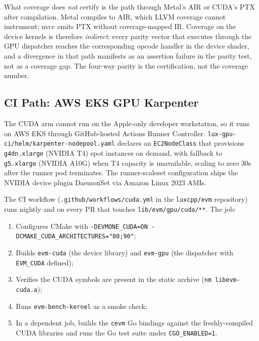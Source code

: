 What coverage does \emph{not} certify is the path through Metal's AIR
or CUDA's PTX after compilation. Metal compiles to AIR, which LLVM
coverage cannot instrument; nvcc emits PTX without coverage-mapped IR.
Coverage on the device kernels is therefore \emph{indirect}: every parity
vector that executes through the GPU dispatcher reaches the corresponding
opcode handler in the device shader, and a divergence in that path
manifests as an assertion failure in the parity test, not as a coverage
gap. The four-way parity is the certification, not the coverage number.

\subsection{CI Path: AWS EKS GPU Karpenter}

\label{sec:cuda:ci}

The CUDA arm cannot run on the Apple-only developer workstation, so it
runs on AWS EKS through GitHub-hosted Actions Runner Controller.
\texttt{lux-gpu-ci/helm/karpenter-nodepool.yaml} declares an
\texttt{EC2NodeClass} that provisions \texttt{g4dn.xlarge}
(NVIDIA T4) spot instances on demand, with fallback to
\texttt{g5.xlarge} (NVIDIA A10G) when T4 capacity is unavailable, scaling
to zero 30s after the runner pod terminates. The runner-scaleset
configuration ships the NVIDIA device plugin DaemonSet via Amazon Linux
2023 AMIs.

The CI workflow (\texttt{.github/workflows/cuda.yml} in the
\texttt{luxcpp/evm} repository) runs nightly and on every PR that touches
\texttt{lib/evm/gpu/cuda/**}. The job:

\begin{enumerate}
  \item Configures CMake with \texttt{-DEVMONE\_CUDA=ON
    -DCMAKE\_CUDA\_ARCHITECTURES="80;90"};
  \item Builds \texttt{evm-cuda} (the device library) and
    \texttt{evm-gpu} (the dispatcher with \texttt{EVM\_CUDA} defined);
  \item Verifies the CUDA symbols are present in the static archive
    (\texttt{nm libevm-cuda.a});
  \item Runs \texttt{evm-bench-kernel} as a smoke check;
  \item In a dependent job, builds the \texttt{cevm} Go bindings against
    the freshly-compiled CUDA libraries and runs the Go test suite under
    \texttt{CGO\_ENABLED=1}.
\end{enumerate}

